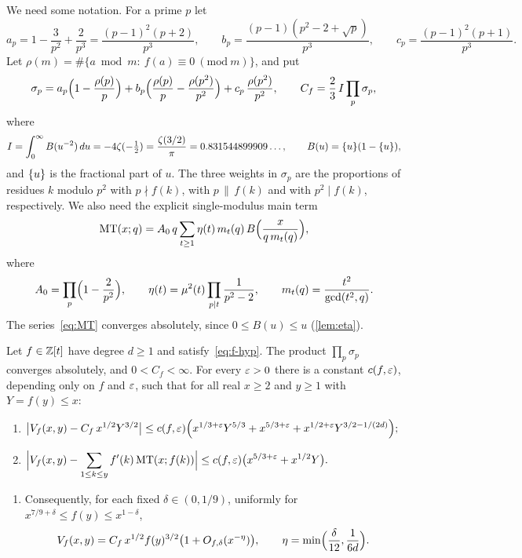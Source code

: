 We need some notation. For a prime $p$ let
\begin{equation}\label{eq:abc}
a_p=1-\frac3{p^2}+\frac2{p^3}=\frac{(p-1)^2(p+2)}{p^3},\qquad
b_p=\frac{(p-1)(p^2-2+\sqrt p)}{p^3},\qquad
c_p=\frac{(p-1)^2(p+1)}{p^3}.
\end{equation}
Let $\rho(m)=\#\{a\bmod m:\ f(a)\equiv0\ (\mathrm{mod}\ m)\}$, and put
\begin{equation}\label{eq:sigma}
\sigma_p=a_p\Bigl(1-\frac{\rho(p)}p\Bigr)+b_p\Bigl(\frac{\rho(p)}p-\frac{\rho(p^2)}{p^2}\Bigr)+c_p\,\frac{\rho(p^2)}{p^2},
\qquad
C_f=\frac23\,I\prod_p\sigma_p,
\end{equation}
where
\begin{equation}\label{eq:I}
I=\int_0^\infty B(u^{-2})\,du=-4\zeta(-\tfrac12)=\frac{\zeta(3/2)}{\pi}=0.831544899909\ldots,\qquad B(u)=\{u\}(1-\{u\}),
\end{equation}
and $\{u\}$ is the fractional part of $u$.
The three weights in $\sigma_p$ are the proportions of residues $k$ modulo $p^2$ with $p\nmid f(k)$, with $p\,\|\,f(k)$ and with $p^2\mid f(k)$, respectively.
We also need the explicit single-modulus main term
\begin{equation}\label{eq:MT}
\mathrm{MT}(x;q)=A_0\,q\sum_{t\ge1}\eta(t)\,m_t(q)\,B\Bigl(\frac{x}{q\,m_t(q)}\Bigr),
\end{equation}
where
\begin{equation}\label{eq:A0-eta}
A_0=\prod_p\Bigl(1-\frac2{p^2}\Bigr),\qquad \eta(t)=\mu^2(t)\prod_{p\mid t}\frac1{p^2-2},\qquad m_t(q)=\frac{t^2}{\gcd(t^2,q)}.
\end{equation}
The series~\eqref{eq:MT} converges absolutely, since $0\le B(u)\le u$ (\cref{lem:eta}).

\begin{theorem}\label{thm:main}
Let $f\in\mathbb{Z}[t]$ have degree $d\ge1$ and satisfy~\eqref{eq:f-hyp}. The product $\prod_p\sigma_p$ converges absolutely, and $0<C_f<\infty$. For every $\varepsilon>0$ there is a constant $c(f,\varepsilon)$, depending only on $f$ and $\varepsilon$, such that for all real $x\ge2$ and $y\ge1$ with $Y=f(y)\le x$:
\begin{enumerate}[label=\textup{(\roman*)}]
\item $\displaystyle\bigl|V_f(x,y)-C_f\,x^{1/2}Y^{3/2}\bigr|\le c(f,\varepsilon)\Bigl(x^{1/3+\varepsilon}Y^{5/3}+x^{5/3+\varepsilon}+x^{1/2+\varepsilon}Y^{3/2-1/(2d)}\Bigr);$
\item $\displaystyle\Bigl|V_f(x,y)-\sum_{1\le k\le y}f'(k)\,\mathrm{MT}(x;f(k))\Bigr|\le c(f,\varepsilon)\bigl(x^{5/3+\varepsilon}+x^{1/2}Y\bigr).$
\end{enumerate}
\begin{enumerate}[label=\textup{(\roman*)},resume]
\item Consequently, for each fixed $\delta\in(0,1/9)$, uniformly for $x^{7/9+\delta}\le f(y)\le x^{1-\delta}$,
\[
V_f(x,y)=C_f\,x^{1/2}f(y)^{3/2}\bigl(1+O_{f,\delta}(x^{-\eta})\bigr),\qquad \eta=\min\Bigl(\frac{\delta}{12},\frac1{6d}\Bigr).
\]
\end{enumerate}
\end{theorem}

